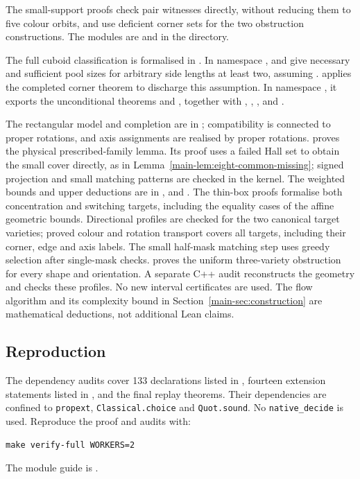 \documentclass[11pt]{article}
\theoremstyle{remark}
\begin{document}
The small-support proofs check pair witnesses directly, without reducing
them to five colour orbits, and use deficient corner sets for the two
obstruction constructions. The modules are  and
 in the  directory.

The full cuboid classification is formalised in
. In namespace
,  and
 give necessary and sufficient pool sizes for
arbitrary side lengths at least two, assuming
.  applies the
completed corner theorem to discharge this assumption. In namespace
, it exports the unconditional theorems
 and , together with
, , ,
 and .

The rectangular model and completion are in
; compatibility is connected to proper
rotations, and axis assignments are realised by proper rotations.
 proves the physical prescribed-family
lemma. Its proof uses a failed Hall set to obtain the small cover directly,
as in Lemma~\ref{main-lem:eight-common-missing}; signed projection and small matching
patterns are checked in the kernel. The weighted bounds and upper deductions
are in , 
and . The thin-box proofs formalise both
concentration and switching targets, including the equality cases of the
affine geometric bounds. Directional profiles are checked for the two
canonical target varieties; proved colour and rotation transport covers
all targets, including their corner, edge and axis labels. The small
half-mask matching step uses greedy selection after single-mask checks.
 proves the
uniform three-variety obstruction for every shape and orientation.
A separate C++ audit reconstructs the geometry and checks these profiles.
No new interval certificates are used. The flow algorithm and its
complexity bound in Section~\ref{main-sec:construction} are mathematical
deductions, not additional Lean claims.

\subsection{Reproduction}
The dependency audits cover 133 declarations listed in ,
fourteen extension statements listed in , and the
final replay theorems. Their dependencies are confined to
\texttt{propext}, \texttt{Classical.choice} and \texttt{Quot.sound}. No \texttt{native\_decide} is used. Reproduce the proof
and audits with:
\begin{verbatim}
make verify-full WORKERS=2
\end{verbatim}
The module guide is .
\end{document}
